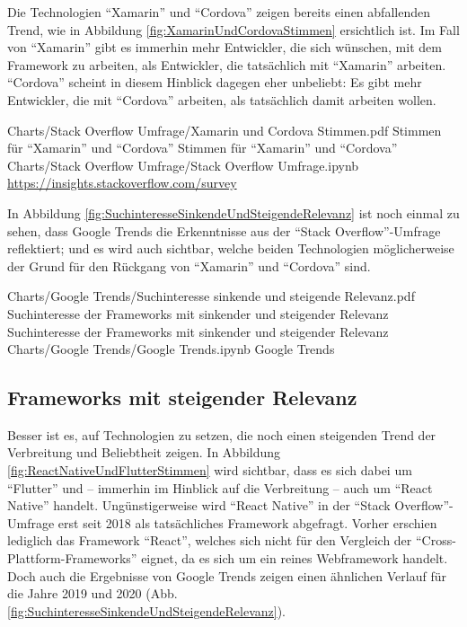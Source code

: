 Die Technologien \enquote{Xamarin} und \enquote{Cordova} zeigen bereits einen abfallenden Trend, wie in Abbildung \ref{fig:XamarinUndCordovaStimmen} ersichtlich ist.
Im Fall von \enquote{Xamarin} gibt es immerhin mehr Entwickler, die sich wünschen, mit dem Framework zu arbeiten, als Entwickler, die tatsächlich mit \enquote{Xamarin} arbeiten.
\enquote{Cordova} scheint in diesem Hinblick dagegen eher unbeliebt: Es gibt mehr Entwickler, die mit \enquote{Cordova} arbeiten, als tatsächlich damit arbeiten wollen.

\begin{alexfigurewithnotebook}{Charts/Stack Overflow Umfrage/Xamarin und Cordova Stimmen.pdf}
	{Stimmen für \enquote{Xamarin} und \enquote{Cordova}}
	{Stimmen für \enquote{Xamarin} und \enquote{Cordova}}
	{Charts/Stack Overflow Umfrage/Stack Overflow Umfrage.ipynb}
	{\url{https://insights.stackoverflow.com/survey}}
	\label{fig:XamarinUndCordovaStimmen}

\end{alexfigurewithnotebook}


In Abbildung \ref{fig:SuchinteresseSinkendeUndSteigendeRelevanz} ist noch einmal zu sehen, dass Google Trends die Erkenntnisse aus der \enquote{Stack Overflow}-Umfrage reflektiert;
und es wird auch sichtbar, welche beiden Technologien möglicherweise der Grund für den Rückgang von \enquote{Xamarin} und \enquote{Cordova} sind.

\begin{alexfigurewithnotebook}{Charts/Google Trends/Suchinteresse sinkende und steigende Relevanz.pdf}
	{Suchinteresse der Frameworks mit sinkender und steigender Relevanz}
	{Suchinteresse der Frameworks mit sinkender und steigender Relevanz}
	{Charts/Google Trends/Google Trends.ipynb}
	{Google Trends}
	\label{fig:SuchinteresseSinkendeUndSteigendeRelevanz}

\end{alexfigurewithnotebook}

\subsection{Frameworks mit steigender Relevanz}

Besser ist es, auf Technologien zu setzen, die noch einen steigenden Trend der Verbreitung und Beliebtheit zeigen.
In Abbildung \ref{fig:ReactNativeUndFlutterStimmen} wird sichtbar, dass es sich dabei um \enquote{Flutter} und -- immerhin im Hinblick auf die Verbreitung -- auch um \enquote{React Native} handelt.
Ungünstigerweise wird \enquote{React Native} in der \enquote{Stack Overflow}-Umfrage erst seit 2018 als tatsächliches Framework abgefragt.
Vorher erschien lediglich das Framework \enquote{React}, welches sich nicht für den Vergleich der \enquote{Cross-Plattform-Frameworks} eignet, da es sich um ein reines Webframework handelt.
Doch auch die Ergebnisse von Google Trends zeigen einen ähnlichen Verlauf für die Jahre 2019 und 2020 (Abb. \ref{fig:SuchinteresseSinkendeUndSteigendeRelevanz}).

